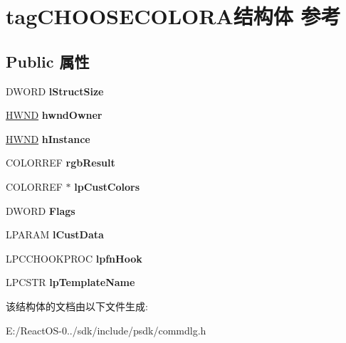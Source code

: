 \hypertarget{structtag_c_h_o_o_s_e_c_o_l_o_r_a}{}\section{tag\+C\+H\+O\+O\+S\+E\+C\+O\+L\+O\+R\+A结构体 参考}
\label{structtag_c_h_o_o_s_e_c_o_l_o_r_a}
\subsection*{Public 属性}
\begin{DoxyCompactItemize}
\item 
\mbox{\label{structtag_c_h_o_o_s_e_c_o_l_o_r_a_afd992a3acea050a21b0fb8c9fcda7090}} 
D\+W\+O\+RD {\bfseries l\+Struct\+Size}
\item 
\mbox{\label{structtag_c_h_o_o_s_e_c_o_l_o_r_a_a7febf41ce8ce0acb41b8776679351461}} 
\hyperlink{interfacevoid}{H\+W\+ND} {\bfseries hwnd\+Owner}
\item 
\mbox{\label{structtag_c_h_o_o_s_e_c_o_l_o_r_a_a3d5d5d69a257f9c192def8b8ab9f436c}} 
\hyperlink{interfacevoid}{H\+W\+ND} {\bfseries h\+Instance}
\item 
\mbox{\label{structtag_c_h_o_o_s_e_c_o_l_o_r_a_a6c69a5f5c1c99d71387820a19be6b562}} 
C\+O\+L\+O\+R\+R\+EF {\bfseries rgb\+Result}
\item 
\mbox{\label{structtag_c_h_o_o_s_e_c_o_l_o_r_a_a92374e570bc7817784425233446483d2}} 
C\+O\+L\+O\+R\+R\+EF $\ast$ {\bfseries lp\+Cust\+Colors}
\item 
\mbox{\label{structtag_c_h_o_o_s_e_c_o_l_o_r_a_a4da937ee5f7ea8f63769567855dacfc3}} 
D\+W\+O\+RD {\bfseries Flags}
\item 
\mbox{\label{structtag_c_h_o_o_s_e_c_o_l_o_r_a_a921c3bb06519a9829d17e67a1294af03}} 
L\+P\+A\+R\+AM {\bfseries l\+Cust\+Data}
\item 
\mbox{\label{structtag_c_h_o_o_s_e_c_o_l_o_r_a_ac4132afc1127bf9cfc20951a4e492c6e}} 
L\+P\+C\+C\+H\+O\+O\+K\+P\+R\+OC {\bfseries lpfn\+Hook}
\item 
\mbox{\label{structtag_c_h_o_o_s_e_c_o_l_o_r_a_ac9e924cec715689735e365ff33197d12}} 
L\+P\+C\+S\+TR {\bfseries lp\+Template\+Name}
\end{DoxyCompactItemize}


该结构体的文档由以下文件生成\+:\begin{DoxyCompactItemize}
\item 
E\+:/\+React\+O\+S-\/0../sdk/include/psdk/commdlg.\+h\end{DoxyCompactItemize}
